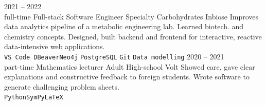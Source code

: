 \documentclass[9pt]{developercv} %
\begin{document}
\begin{entrylist}
	\entry
		{2021 -- 2022 \\\footnotesize{full-time}}
		{Full-stack Software Engineer}
		{Specialty Carbohydrates Inbiose}
		{Improves data analytics pipeline of a metabolic engineering lab. Learned biotech. and chemistry concepts. Designed, built backend and frontend for interactive, reactive data-intensive web applications.\\ \texttt{VS Code }\slashsep\texttt{DBeaver}\slashsep\texttt{Neo4j} \slashsep\texttt{PostgreSQL} \slashsep\texttt{Git} \slashsep\texttt{Data modelling}}
	\entry
		{2020 -- 2021\\\footnotesize{part-time}}
		{Mathematics lecturer}
		{Adult High-school Volt}
		{Showed care, gave clear explanations and constructive feedback to foreign students. Wrote software to generate challenging problem sheets.\\ \texttt{Python}\slashsep\texttt{SymPy}\slashsep\texttt{\LaTeX}}
		
		
\end{entrylist}


\end{document}
